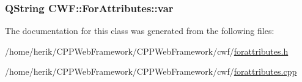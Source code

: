 \hypertarget{class_c_w_f_1_1_for_attributes_a531689e9e92369507be81971caf347a6}{
\subsubsection[{var}]{\setlength{\rightskip}{0pt plus 5cm}Q\+String C\+W\+F\+::\+For\+Attributes\+::var}}\label{class_c_w_f_1_1_for_attributes_a531689e9e92369507be81971caf347a6}


The documentation for this class was generated from the following files\+:\begin{DoxyCompactItemize}
\item 
/home/herik/\+C\+P\+P\+Web\+Framework/\+C\+P\+P\+Web\+Framework/cwf/\hyperlink{forattributes_8h}{forattributes.\+h}\item 
/home/herik/\+C\+P\+P\+Web\+Framework/\+C\+P\+P\+Web\+Framework/cwf/\hyperlink{forattributes_8cpp}{forattributes.\+cpp}\end{DoxyCompactItemize}
